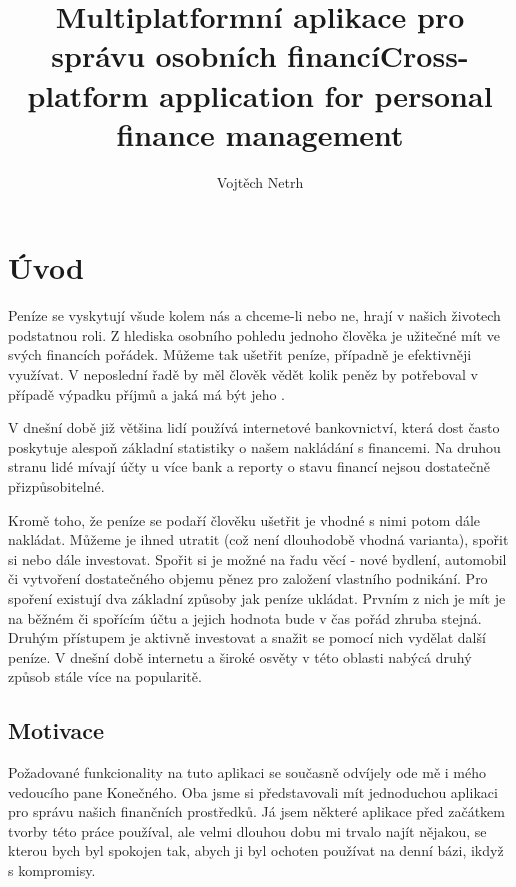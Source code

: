 \documentclass[
  biblatex,
  figures=false,
  tables=false,
  glossaries,
  index
]{kidiplom}
\title{Multiplatformní aplikace pro správu osobních financí}
\title[english]{Cross-platform application for personal finance management}
\author{Vojtěch Netrh}
\begin{document}
\maketitle



\newcommand{\BibLaTeX}{\textsc{Bib}\LaTeX}


\section{Úvod}
Peníze se vyskytují všude kolem nás a chceme-li nebo ne, hrají v našich životech podstatnou roli. Z hlediska osobního pohledu jednoho člověka je užitečné mít ve svých financích pořádek. Můžeme tak ušetřit peníze, případně je efektivněji využívat. V neposlední řadě by měl člověk vědět kolik peněz by potřeboval v případě výpadku příjmů a jaká má být jeho .

V dnešní době již většina lidí používá internetové bankovnictví, která dost často poskytuje alespoň základní statistiky o našem nakládání s financemi. Na druhou stranu lidé mívají účty u více bank a reporty o stavu financí nejsou dostatečně přizpůsobitelné.

Kromě toho, že peníze se podaří člověku ušetřit je vhodné s nimi potom dále nakládat. Můžeme je ihned utratit (což není dlouhodobě vhodná varianta), spořit si nebo dále investovat. Spořit si je možné na řadu věcí - nové bydlení, automobil či vytvoření dostatečného objemu pěnez pro založení vlastního podnikání. Pro spoření existují dva základní způsoby jak peníze ukládat. Prvním z nich je mít je na běžném či spořícím účtu a jejich hodnota bude v čas pořád zhruba stejná. Druhým přístupem je aktivně investovat a snažit se pomocí nich vydělat další peníze. V dnešní době internetu a široké osvěty v této oblasti nabýcá druhý způsob stále více na popularitě.

\subsection{Motivace}
Požadované funkcionality na tuto aplikaci se současně odvíjely ode mě i mého vedoucího pane Konečného. Oba jsme si představovali mít jednoduchou aplikaci pro správu našich finančních prostředků. Já jsem některé aplikace před začátkem tvorby této práce používal, ale velmi dlouhou dobu mi trvalo najít nějakou, se kterou bych byl spokojen tak, abych ji byl ochoten používat na denní bázi, ikdyž s kompromisy.
\end{document}
